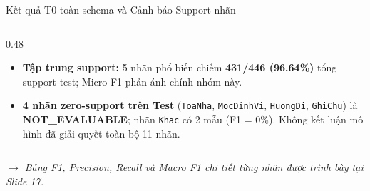 \documentclass[aspectratio=169, 9pt]{beamer}
\begin{document}
\begin{frame}{Kết quả T0 toàn schema và Cảnh báo Support nhãn}
{\begin{columns}[T]
\begin{column}{0.48\textwidth}
\begin{itemize}
        \item \textbf{Tập trung support:} 5 nhãn phổ biến chiếm \textbf{431/446 (96.64\%)} tổng support test; Micro F1 phản ánh chính nhóm này.
        \item \textbf{4 nhãn zero-support trên Test} (\texttt{ToaNha}, \texttt{MocDinhVi}, \texttt{HuongDi}, \texttt{GhiChu}) là \textbf{\color{alertred}NOT\_EVALUABLE}; nhãn \texttt{Khac} có 2 mẫu (F1 = 0\%). Không kết luận mô hình đã giải quyết toàn bộ 11 nhãn.
      \end{itemize}
    \end{column}
  \end{columns}
  }
  \vspace{0.05cm}
  \begin{center}
    {\fontsize{7.2pt}{9pt}\selectfont\textit{\color{gray} $\to$ Bảng F1, Precision, Recall và Macro F1 chi tiết từng nhãn được trình bày tại Slide 17.}}
  \end{center}
\end{frame}
\end{document}
